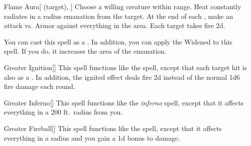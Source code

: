 \lowercase{\hypertarget{spell:Flame Aura}{}}\label{spell:Flame Aura}
\begin{attuneability}[\nth{4}]{\hypertarget{spell:Flame Aura}{Flame Aura}}[ (target), ]
Choose a willing creature within \rngclose range.
Heat constantly radiates in a \areamed radius emanation from the target.
At the end of each , make an attack vs. Armor against everything in the area.
\hit Each target takes fire  \minus2d.

You can cast this spell as a .
In addition, you can apply the Widened  to this spell.
If you do, it increases the area of the emanation.
\end{attuneability}
\vspace{0.25em}



\lowercase{\hypertarget{spell:Greater Ignition}{}}\label{spell:Greater Ignition}
\begin{apability}[\nth{4}]{\hypertarget{spell:Greater Ignition}{Greater Ignition}}[]
This spell functions like the  spell, except that each target hit is also  as a .
In addition, the ignited effect deals fire  \minus2d instead of the normal 1d6 fire damage each round.
\end{apability}
\vspace{0.25em}



\lowercase{\hypertarget{spell:Greater Inferno}{}}\label{spell:Greater Inferno}
\begin{apability}[\nth{5}]{\hypertarget{spell:Greater Inferno}{Greater Inferno}}[]
This spell functions like the \textit{inferno} spell, except that it affects everything in a 200 ft.\ radius from you.
\end{apability}
\vspace{0.25em}



\lowercase{\hypertarget{spell:Greater Fireball}{}}\label{spell:Greater Fireball}
\begin{apability}[\nth{6}]{\hypertarget{spell:Greater Fireball}{Greater Fireball}}[]
This spell functions like the  spell, except that it affects everything in a \arealarge radius and you gain a \plus1d bonus to damage.
\end{apability}
\vspace{0.25em}



